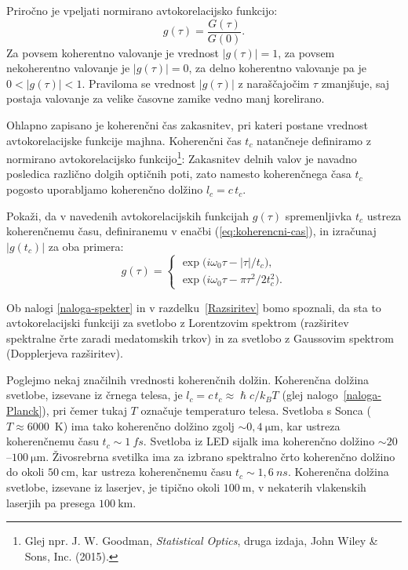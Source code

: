 Priročno je vpeljati normirano avtokorelacijsko funkcijo:
\begin{equation}
g(\tau)=\frac{G(\tau)}{G(0)}.
\label{eq:avtokorelacija-norm}
\end{equation}
Za povsem koherentno valovanje je vrednost $|g(\tau)|=1$, za povsem nekoherentno
valovanje je $|g(\tau)|=0$, za delno koherentno valovanje pa je $0<|g(\tau)|<1$.
Praviloma se vrednost $|g(\tau)|$ z naraščajočim $\tau$ zmanjšuje,
saj postaja valovanje za velike časovne zamike vedno manj korelirano.

Ohlapno zapisano je koherenčni čas zakasnitev, pri kateri postane
vrednost avtokorelacijske funkcije majhna.
Koherenčni čas $t_{c}$ natančneje definiramo 
z normirano avtokorelacijsko funkcijo\footnote{Glej npr. J. W. Goodman, {\it Statistical Optics}, druga izdaja, 
John Wiley \& Sons, Inc. (2015).}:
Zakasnitev delnih valov je navadno posledica
različno dolgih optičnih poti, zato namesto koherenčnega časa $t_c$
pogosto uporabljamo koherenčno dolžino $l_{c}=c\,t_{c}$. 
\newpage

\begin{naloga}
Pokaži, da v navedenih avtokorelacijskih
funkcijah $g(\tau)$ spremenljivka $t_{c}$ ustreza koherenčnemu času,
definiranemu v enačbi (\ref{eq:koherencni-cas}), in izračunaj $|g(t_{c})|$ za oba primera:
\begin{equation}
g(\tau)=\begin{cases}
\exp\big(i\omega_{0}\tau-\left|\tau\right|/t_{c}\big),\\
\exp\big(i\omega_{0}\tau-\pi\tau^{2}/2t_{c}^{2}\big).
\end{cases}
\label{eq:gauss-eksponent}
\end{equation}

Ob nalogi \ref{naloga-spekter} in v razdelku~\ref{Razsiritev} 
bomo spoznali, da sta to avtokorelacijski
funkciji za svetlobo z Lorentzovim spektrom
(razširitev spektralne črte zaradi medatomskih trkov) in za 
svetlobo z Gaussovim spektrom
(Dopplerjeva razširitev).
\end{naloga}

Poglejmo nekaj značilnih vrednosti koherenčnih dolžin. 
Koherenčna dolžina svetlobe, izsevane iz črnega telesa, je 
$l_{c}=c\,t_{c}\approx \hslash c/k_{B}T$ (glej nalogo~\ref{naloga-Planck}), pri 
čemer tukaj $T$ označuje temperaturo telesa. 
Svetloba s Sonca ($T \approx 6000$~K)
ima tako koherenčno dolžino zgolj $\sim 0,4~\si{\micro\metre}$, kar ustreza
koherenčnemu času $t_c \sim 1~\si{fs}$. Svetloba
iz LED sijalk ima koherenčno dolžino $\sim20$--$100~\si{\micro\metre}$.
Živosrebrna svetilka ima za izbrano spektralno črto koherenčno dolžino
do okoli $50~\si{\centi\metre}$, kar ustreza koherenčnemu času $t_c \sim 1,6~\si{ns}$.
Koherenčna dolžina svetlobe, izsevane iz laserjev, je tipično okoli $100~\si{\metre}$, 
v nekaterih vlakenskih laserjih pa presega $100~\si{\kilo\metre}$.


